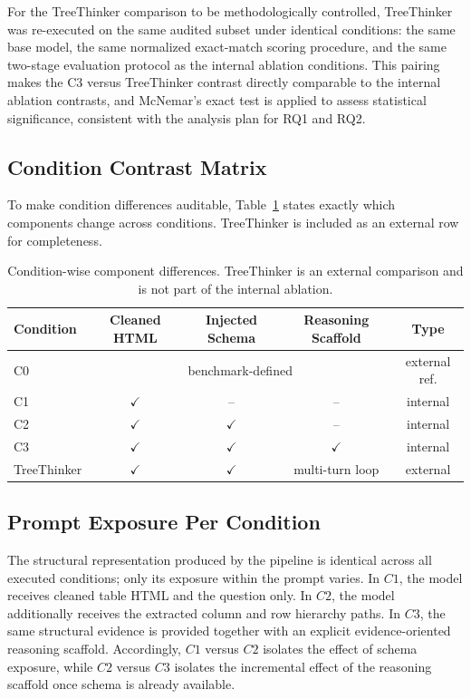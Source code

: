 ﻿\documentclass[a4paper]{article}
\begin{document}
For the TreeThinker comparison to be methodologically controlled, 
TreeThinker was re-executed on the same audited subset under 
identical conditions: the same base model, the same normalized 
exact-match scoring procedure, and the same two-stage evaluation 
protocol as the internal ablation conditions. This pairing makes 
the C3 versus TreeThinker contrast directly comparable to the 
internal ablation contrasts, and McNemar's exact test is applied 
to assess statistical significance, consistent with the analysis 
plan for RQ1 and RQ2.

\subsection{Condition Contrast Matrix}

To make condition differences auditable, 
Table~\ref{tab:condition-contrast} states exactly which components 
change across conditions. TreeThinker is included as an external 
row for completeness.

\begin{table}[h]
\centering
\caption{Condition-wise component differences. TreeThinker is an 
external comparison and is not part of the internal ablation.}
\label{tab:condition-contrast}
\begin{tabular}{lcccc}
\toprule
\textbf{Condition} & \textbf{Cleaned HTML} & \textbf{Injected Schema} 
    & \textbf{Reasoning Scaffold} & \textbf{Type} \\
\midrule
C0                 & \multicolumn{3}{c}{benchmark-defined} 
    & external ref. \\
C1                 & $\checkmark$ & --           & -- 
    & internal \\
C2                 & $\checkmark$ & $\checkmark$ & -- 
    & internal \\
C3                 & $\checkmark$ & $\checkmark$ & $\checkmark$ 
    & internal \\
TreeThinker        & $\checkmark$ & $\checkmark$ & multi-turn loop 
    & external \\
\bottomrule
\end{tabular}
\end{table}

\subsection{Prompt Exposure Per Condition}

The structural representation produced by the pipeline is identical 
across all executed conditions; only its exposure within the prompt 
varies. In \(C1\), the model receives cleaned table HTML and the 
question only. In \(C2\), the model additionally receives the 
extracted column and row hierarchy paths. In \(C3\), the same 
structural evidence is provided together with an explicit 
evidence-oriented reasoning scaffold. Accordingly, \(C1\) versus 
\(C2\) isolates the effect of schema exposure, while \(C2\) versus 
\(C3\) isolates the incremental effect of the reasoning scaffold 
once schema is already available.
\end{document}

